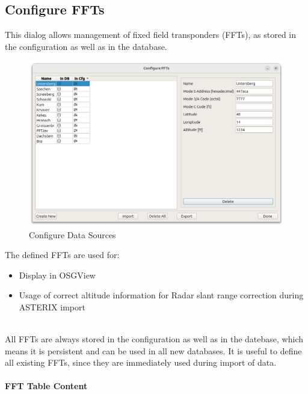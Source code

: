 \subsection{Configure FFTs}
\label{sec:ui_configure_ffts}

This dialog allows management of fixed field transponders (FFTs), as stored in the configuration as well as in the database. \\

\begin{figure}[H]
    \hspace*{-2cm}
    \includegraphics[width=18cm]{figures/configure_ffts.png}
  \caption{Configure Data Sources}
\end{figure}

The defined FFTs are used for:
\begin{itemize}
\item Display in OSGView
\item Usage of correct altitude information for Radar slant range correction during ASTERIX import
\end{itemize}
\ \\

All FFTs are always stored in the configuration as well as in the datebase, which means it is persistent and can be used in all new databases. It is useful to define all existing FFTs, since they are immediately used during import of data. \\

\paragraph {FFT Table Content}
\label{sec:configure_ffts_table_content}

